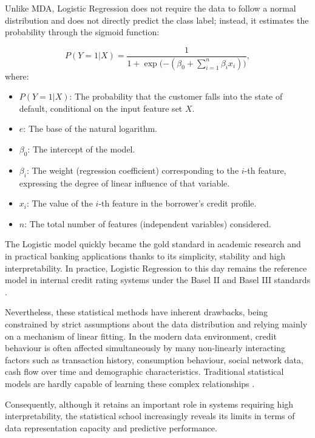 Unlike MDA, Logistic Regression does not require the data to follow a normal distribution and does not directly predict the class label; instead, it estimates the probability through the sigmoid function:

\begin{equation}
P(Y=1|X) = \frac{1}{1 + \exp ({-\left(\beta_0 + \sum_{i=1}^{n}\beta_i x_i\right))}},
\end{equation}
where:
\begin{itemize}
    \item $P(Y=1|X)$: The probability that the customer falls into the state of default, conditional on the input feature set $X$.
    \item $e$: The base of the natural logarithm.
    \item $\beta_0$: The intercept of the model.
    \item $\beta_i$: The weight (regression coefficient) corresponding to the $i$-th feature, expressing the degree of linear influence of that variable.
    \item $x_i$: The value of the $i$-th feature in the borrower's credit profile.
    \item $n$: The total number of features (independent variables) considered.
\end{itemize}
\vspace{1em}

The Logistic model quickly became the gold standard in academic research and in practical banking applications thanks to its simplicity, stability and high interpretability. In practice, Logistic Regression to this day remains the reference model in internal credit rating systems under the Basel II and Basel III standards \cite{basel2006international}.

Nevertheless, these statistical methods have inherent drawbacks, being constrained by strict assumptions about the data distribution and relying mainly on a mechanism of linear fitting. In the modern data environment, credit behaviour is often affected simultaneously by many non-linearly interacting factors such as transaction history, consumption behaviour, social network data, cash flow over time and demographic characteristics. Traditional statistical models are hardly capable of learning these complex relationships \cite{lessmann2015benchmarking}.

Consequently, although it retains an important role in systems requiring high interpretability, the statistical school increasingly reveals its limits in terms of data representation capacity and predictive performance.

